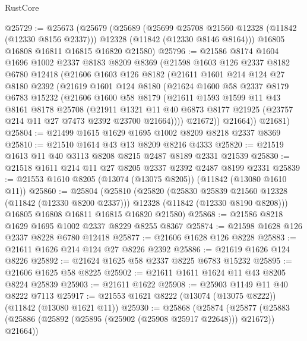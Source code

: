 \begin{lexlean}{RustCore}
\begin{coremodule}
@25729 := @25673
    (@25679
      (@25689
        (@25699 @25708 @21560 @12328 (@11842 (@12330 @8156 @2337)))
        @12328
        (@11842 (@12330 @8146 @8164)))
      @16805
      @16808
      @16811
      @16815
      @16820
      @21580)
@25796 := @21586
    @8174
    @1604
    @1696
    @1002
    @2337
    @8183
    @8209
    @8369
    (@21598
      @1603
      @126
      @2337
      @8182
      @6780
      @12418
      (@21606
        @1603
        @126
        @8182
        (@21611
          @1601
          @214
          @124
          @27
          @8180
          @2392
          (@21619
            @1601
            @124
            @8180
            (@21624
              @1600
              @58
              @2337
              @8179
              @6783
              @15232
              (@21606
                @1600
                @58
                @8179
                (@21611
                  @1593
                  @1599
                  @11
                  @43
                  @8161
                  @8178
                  @25708
                  (@21911
                    @1321
                    @11
                    @40
                    @6873
                    @8177
                    @21925
                    (@23757 @214 @11 @27 @7473 @2392 @23700 @21664))))
              @21672))
          @21664))
      @21681)
@25804 := @21499 @1615 @1629 @1695 @1002 @8209 @8218 @2337 @8369
@25810 := @21510 @1614 @43 @13 @8209 @8216 @4333
@25820 := @21519 @1613 @11 @40 @3113 @8208 @8215 @2487 @8189 @2331 @21539
@25830 := @21518 @1611 @214 @11 @27 @8205 @2337 @2392 @2487 @8199 @2331
@25839 := @21553 @1610 @8205 (@13074 (@13075 @8205)) (@11842 (@13080 @1610 @11))
@25860 := @25804
    (@25810
      (@25820
        (@25830 @25839 @21560 @12328 (@11842 (@12330 @8200 @2337)))
        @12328
        (@11842 (@12330 @8190 @8208)))
      @16805
      @16808
      @16811
      @16815
      @16820
      @21580)
@25868 := @21586 @8218 @1629 @1695 @1002 @2337 @8229 @8255 @8367
@25874 := @21598 @1628 @126 @2337 @8228 @6780 @12418
@25877 := @21606 @1628 @126 @8228
@25883 := @21611 @1626 @214 @124 @27 @8226 @2392
@25886 := @21619 @1626 @124 @8226
@25892 := @21624 @1625 @58 @2337 @8225 @6783 @15232
@25895 := @21606 @1625 @58 @8225
@25902 := @21611 @1611 @1624 @11 @43 @8205 @8224 @25839
@25903 := @21611 @1622
@25908 := @25903 @1149 @11 @40 @8222 @7113
@25917 := @21553 @1621 @8222 (@13074 (@13075 @8222)) (@11842 (@13080 @1621 @11))
@25930 := @25868
    (@25874
      (@25877 (@25883 (@25886 (@25892 (@25895 (@25902 (@25908 @25917 @22648))) @21672)) @21664))

\end{coremodule}
\end{lexlean}
